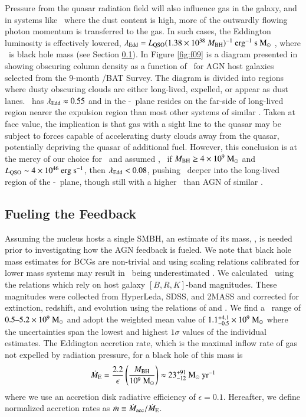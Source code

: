 \documentclass[referee,traditabstract]{aa}
\begin{document}
Pressure from the quasar radiation field will also influence gas in
the galaxy, and in systems like \irs\ where the dust content is high,
more of the outwardly flowing photon momentum is transferred to the
gas. In such cases, the Eddington luminosity is effectively lowered,
$\lambda_{\rm{Edd}} = L_{\rm{QSO}} (1.38 \times 10^{38} ~M_{\rm{BH}})^{-1} ~\mbox{\ensuremath{\rm{erg}}}^{-1} ~\mbox{\ensuremath{\rm{s}}} ~\rm{M_{\odot}}$
\citep[\eg][]{1993ApJ...402..441L}, where \mbh\ is black hole mass
(see Section \ref{sec:fuel}). In Figure \ref{fig:f09} is a diagram
presented in \citet{2009MNRAS.394L..89F} showing obscuring column
density as a function of \leff\ for AGN host galaxies selected from
the 9-month \swift/BAT Survey. The diagram is divided into regions
where dusty obscuring clouds are either long-lived, expelled, or
appear as dust lanes. \irs\ has $\lambda_{\rm{Edd}} \approx 0.55$ and in the
\nhobs-\leff\ plane resides on the far-side of long-lived region
nearer the expulsion region than most other systems of similar \nhobs.
Taken at face value, the implication is that gas with a sight line to
the quasar may be subject to forces capable of accelerating dusty
clouds away from the quasar, potentially depriving the quasar of
additional fuel. However, this conclusion is at the mercy of our
choice for \mbh\ and assumed \lqso, \ie\ if $M_{\rm{BH}} \ge 4 \times 10^9
~\rm{M_{\odot}}$ and $L_{\rm{QSO}} \sim 4 \times 10^{46} ~\rm{\mbox{\ensuremath{\rm{erg}}}~\ensuremath{\rm{\mbox{\ensuremath{\rm{s}}}^{-1}}}}$, then $\lambda_{\rm{Edd}} < 0.08$,
pushing \irs\ deeper into the long-lived region of the
\nhobs-\leff\ plane, though still with a higher \leff\ than AGN of
similar \nhobs.

\subsection{Fueling the Feedback}
\label{sec:fuel}

Assuming the nucleus hosts a single SMBH, an estimate of its mass,
\mbh, is needed prior to investigating how the AGN feedback is
fueled. We note that black hole mass estimates for BCGs are
non-trivial and using scaling relations calibrated for lower mass
systems may result in \mbh\ being underestimated
\citep[\eg][]{2007ApJ...662..808L, 2009ApJ...690..537D}. We calculated
\mbh\ using the \citet{2007MNRAS.379..711G} relations which rely on
host galaxy $[B,R,K]$-band magnitudes. These magnitudes were collected
from HyperLeda, SDSS, and 2MASS and corrected for extinction,
redshift, and evolution using the relations of \citet{cardelli89} and
\citet{poggianti97}. We find a \mbh\ range of $0.5 \mbox{--} 5.2 \times
10^9 ~\rm{M_{\odot}}$ and adopt the weighted mean value of $1.1^{+4.1}_{-0.5}
\times 10^9 ~\rm{M_{\odot}}$ where the uncertainties span the lowest and
highest $1\sigma$ values of the individual estimates. The Eddington
accretion rate, which is the maximal inflow rate of gas not expelled
by radiation pressure, for a black hole of this mass is
\begin{equation}
  \dot{M}_{\rm{E}} = \frac{2.2}{\epsilon} \left(\frac{M_{\rm{BH}}}{10^9~\rm{M_{\odot}}}\right)
  \approx 23^{+91}_{-12} ~\mbox{\ensuremath{\rm{M_{\odot}}~\rm{\mbox{\ensuremath{\rm{yr}}}^{-1}}}}
\end{equation}
where we use an accretion disk radiative efficiency of $\epsilon =
0.1$. Hereafter, we define normalized accretion rates as $\dot{m}
\equiv \dot{M}_{\rm{acc}}/\dot{M}_{\rm{E}}$.
\end{document}
